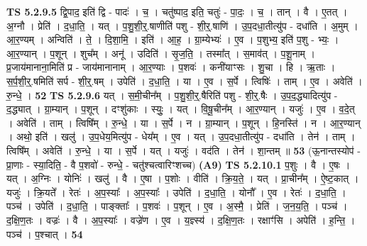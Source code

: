 \documentclass[17pt]{extarticle}
\begin{document}
                  \newline
                                \textbf{ TS 5.2.9.5} \newline
                  द्वि॒पाद॒ इति॑ द्वि - पादः॑ । च॒ । चतु॑ष्पाद॒ इति॒ चतुः॑ - पा॒दः॒ । च॒ । तान् । वै । ए॒तत् । अ॒ग्नौ । प्रेति॑ । द॒धा॒ति॒ । यत् । प॒शु॒शी॒र्॒.षाणीति॑ पशु - शी॒र्॒.षाणि॑ । उ॒प॒दधा॒तीत्यु॑प - दधा॑ति । अ॒मुम् । आ॒र॒ण्यम् । अन्विति॑ । ते॒ । दि॒शा॒मि॒ । इति॑ । आ॒ह॒ । ग्रा॒म्येभ्यः॑ । ए॒व । प॒शुभ्य॒ इति॑ प॒शु - भ्यः॒ । आ॒र॒ण्यान् । प॒शून् । शुच᳚म् । अनू॑ । उदिति॑ । सृ॒ज॒ति॒ । तस्मा᳚त् । स॒माव॑त् । प॒शू॒नाम् । प्र॒जाय॑मानाना॒मिति॑ प्र - जाय॑मानानाम् । आ॒र॒ण्याः । प॒शवः॑ । कनी॑याꣳसः । शु॒चा । हि । ऋ॒ताः । स॒र्प॒शी॒र्॒.षमिति॑ सर्प - शी॒र्॒.षम् । उपेति॑ । द॒धा॒ति॒ । या । ए॒व । स॒र्पे । त्विषिः॑ । ताम् । ए॒व । अवेति॑ । रु॒न्धे॒ । \textbf{  52} \newline
                  \newline
                                \textbf{ TS 5.2.9.6} \newline
                  यत् । स॒मी॒चीन᳚म् । प॒शु॒शी॒र्॒.षैरिति॑ पशु - शी॒र्॒.षैः । उ॒प॒द॒द्ध्यादित्यु॑प - द॒द्ध्यात् । ग्रा॒म्यान् । प॒शून् । दꣳशु॑काः । स्युः॒ । यत् । वि॒षू॒चीन᳚म् । आ॒र॒ण्यान् । यजुः॑ । ए॒व । व॒दे॒त् । अवेति॑ । ताम् । त्विषि᳚म् । रु॒न्धे॒ । या । स॒र्पे । न । ग्रा॒म्यान् । प॒शून् । हि॒नस्ति॑ । न । आ॒र॒ण्यान् । अथो॒ इति॑ । खलु॑ । उ॒प॒धेय॒मित्यु॑प - धेय᳚म् । ए॒व । यत् । उ॒प॒दधा॒तीत्यु॑प - दधा॑ति । तेन॑ । ताम् । त्विषि᳚म् । अवेति॑ । रु॒न्धे॒ । या । स॒र्पे । यत् । यजुः॑ । वद॑ति । तेन॑ । शा॒न्तम् ॥ \textbf{  53} \newline
                  \newline
                      (ऊ॒नान्तस्योप॑ - प्रा॒णाः - स्या॒दिति॒ - वै प॒शवो॑ - रुन्धे॒ - चतु॑श्चत्वारिꣳशच्च)  \textbf{(A9)} \newline \newline
                                \textbf{ TS 5.2.10.1} \newline
                  प॒शुः । वै । ए॒षः । यत् । अ॒ग्निः । योनिः॑ । खलु॑ । वै । ए॒षा । प॒शोः । वीति॑ । क्रि॒य॒ते॒ । यत् । प्रा॒चीन᳚म् । ऐ॒ष्ट॒कात् । यजुः॑ । क्रि॒यते᳚ । रेतः॑ । अ॒प॒स्याः᳚ । अ॒प॒स्याः᳚ । उपेति॑ । द॒धा॒ति॒ । योनौ᳚ । ए॒व । रेतः॑ । द॒धा॒ति॒ । पञ्च॑ । उपेति॑ । द॒धा॒ति॒ । पाङ्क्ताः᳚ । प॒शवः॑ । प॒शून् । ए॒व । अ॒स्मै॒ । प्रेति॑ । ज॒न॒य॒ति॒ । पञ्च॑ । द॒क्षि॒ण॒तः । वज्रः॑ । वै । अ॒प॒स्याः᳚ । वज्रे॑ण । ए॒व । य॒ज्ञ्स्य॑ । द॒क्षि॒ण॒तः । रक्षाꣳ॑सि । अपेति॑ । ह॒न्ति॒ । पञ्च॑ । प॒श्चात् । \textbf{  54} \newline
                  \newline
\end{document}
